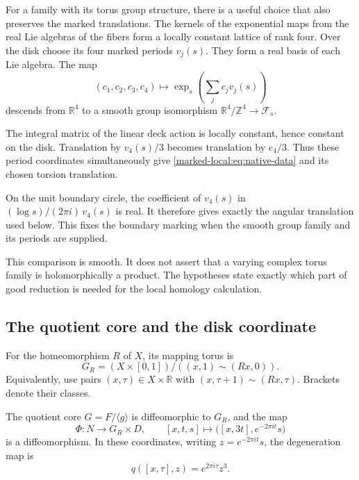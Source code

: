 For a family with its torus group structure, there is a useful choice
that also preserves the marked translations. The kernels of the
exponential maps from the real Lie algebras of the fibers form a locally
constant lattice of rank four. Over the disk choose its four marked
periods $v_j(s)$. They form a real basis of each Lie algebra. The map
\[
 (c_1,c_2,c_3,c_4)\longmapsto
       \exp_s\!\left(\sum_jc_jv_j(s)\right)
\]
descends from $\mathbb R^4$ to a smooth group isomorphism
$\mathbb R^4/\mathbb Z^4\to\mathcal F_s$.

The integral matrix of the linear deck action is locally constant,
hence constant on the disk. Translation by $v_4(s)/3$ becomes
translation by $e_4/3$. Thus these period coordinates simultaneously
give \eqref{marked-local:eq:native-data} and its chosen torsion translation.

On the unit boundary circle, the coefficient of $v_4(s)$ in
$(\log s)/(2\pi i)\,v_4(s)$ is real. It therefore gives exactly
the angular translation used below. This fixes the boundary marking
when the smooth group family and its periods are supplied.

This comparison is smooth. It does not assert that a varying complex
torus family is holomorphically a product. The hypotheses state exactly
which part of good reduction is needed for the local homology calculation.

\subsection{The quotient core and the disk coordinate}

For the homeomorphism $R$ of $X$, its mapping torus is
\[
 G_R=(X\times[0,1])/((x,1)\sim(Rx,0)).
\]
Equivalently, use pairs $(x,\tau)\in X\times\mathbb R$ with
$(x,\tau+1)\sim(Rx,\tau)$. Brackets denote their classes.

\begin{proposition}\label{marked-local:prop:disk-product}
The quotient core $G=F/\langle g\rangle$ is diffeomorphic to $G_R$,
and the map
\begin{equation}\label{marked-local:eq:disk-product}
 \Phi:N\longrightarrow G_R\times D,
 \qquad [x,t,s]\longmapsto\bigl([x,3t],e^{-2\pi it}s\bigr)
\end{equation}
is a diffeomorphism. In these coordinates, writing $z=e^{-2\pi it}s$,
the degeneration map is
\begin{equation}\label{marked-local:eq:degeneration-map}
                   q([x,\tau],z)=e^{2\pi i\tau}z^3.
\end{equation}
\end{proposition}

